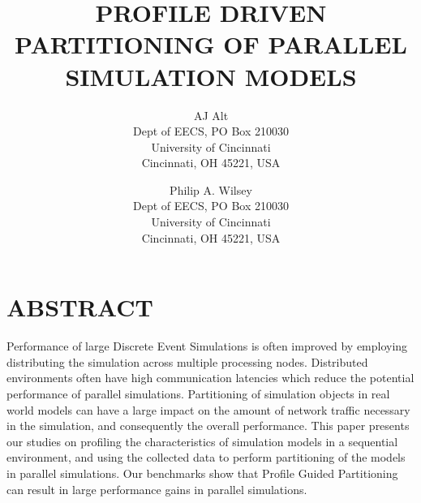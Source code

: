 \documentclass{wscpaperproc}
\begin{document}
%
%

\title{PROFILE DRIVEN PARTITIONING OF PARALLEL SIMULATION MODELS}

\author{AJ Alt\\ [12pt]
Dept of EECS, PO Box 210030\\
University of Cincinnati\\
Cincinnati, OH 45221, USA\\
\and
Philip A. Wilsey \\[12pt]
Dept of EECS, PO Box 210030\\
University of Cincinnati\\
Cincinnati, OH 45221, USA
}

\maketitle

\section*{ABSTRACT}

Performance of large Discrete Event Simulations is often improved by employing distributing the simulation across multiple processing nodes. Distributed environments often have high communication latencies which reduce the potential performance of parallel simulations. Partitioning of simulation objects in real world models can have a large impact on the amount of network traffic necessary in the simulation, and consequently the overall performance. This paper presents our studies on profiling the characteristics of simulation models in a sequential environment, and using the collected data to perform partitioning of the models in parallel simulations. Our benchmarks show that Profile Guided Partitioning can result in large performance gains in parallel simulations.
\end{document}
